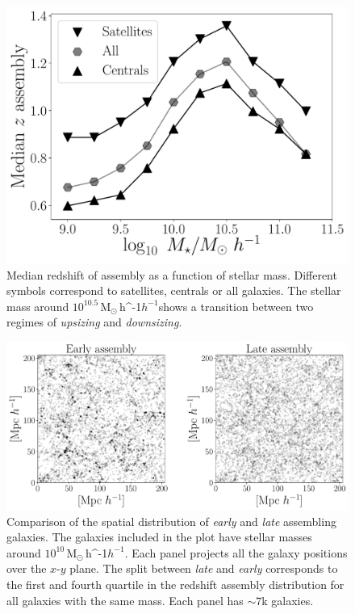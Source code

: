 \documentclass[a4paper,fleqn,usenatbib]{mnras}
\newcommand{\Msunh}{\,{\rm M}$_{\odot}$\,\ifmmode h^{-1}\else $h^{-1}$\fi}
\begin{document}
\begin{figure}
    \centering
    \includegraphics[width=1\columnwidth]{figuras/median_assembly.pdf}
    \caption{Median redshift of assembly as a function of stellar mass.
    Different symbols correspond to satellites, centrals or all galaxies.
    The stellar mass around $10^{10.5}$\Msunh shows a transition between two 
    regimes of \emph{upsizing} and \emph{downsizing}.}
    \label{fig:median_assembly}
\end{figure}
 
 \begin{figure}
    \centering
    \includegraphics[width=1.8\columnwidth]{figuras/scatter_assembly.pdf}
    \caption{Comparison of the spatial distribution of \emph{early} and \emph{late} assembling galaxies.
    The galaxies included in the plot have stellar masses around $10^{10}$\Msunh. 
    Each panel projects all the galaxy positions over the $x$-$y$ plane. 
    The split between \emph{late} and \emph{early} corresponds to the first and fourth quartile in the redshift assembly distribution for all galaxies with the same mass.
    Each panel has $\sim7$k galaxies. }
    \label{fig:comparison}
\end{figure}
\end{document}
